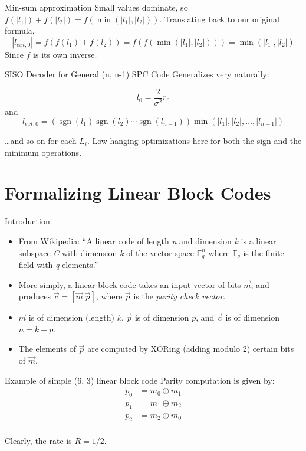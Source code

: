 \documentclass[aspectratio=1610, 10pt]{beamer}
\DeclareMathOperator{\sgn}{sgn}
\begin{document}
\begin{frame}[label={sec:org9aeebc2}]{Min-sum approximation}
Small values dominate, so \(f(|l_1|) + f(|l_2|) =
f(\min{(|l_1|, |l_2|)})\). Translating back to our original formula,
$$|l_{ext,0}| = f(f(l_1) + f(l_2)) = f(f(\min{(|l_1|, |l_2|)})) =
\min{(|l_1|, |l_2|)}$$
Since \(f\) is its own inverse.
\end{frame}

\begin{frame}[label={sec:org236c83d}]{SISO Decoder for General (n, n-1) SPC Code}
Generalizes very naturally:

$$l_0 = \frac{2}{\sigma^2}r_0$$
and
$$l_{ext,0} = (\sgn{(l_1)}\sgn{(l_2)}\cdots\sgn{(l_{n-1})})\min{(|l_1|, |l_2|,
\ldots, |l_{n-1}|)}$$

\ldots{}and so on for each \(L_i\). Low-hanging optimizations here for both
the sign and the minimum operations.
\end{frame}

\section{Formalizing Linear Block Codes}
\label{sec:org2e2c8ff}

\begin{frame}[label={sec:org2f0f6fa}]{Introduction}
\begin{itemize}
\item From Wikipedia: ``A \alert{linear code} of length \emph{n} and dimension
\emph{k} is a linear subspace \emph{C} with dimension \emph{k} of the vector space
\(\mathbb{F}_q^n\) where \(\mathbb{F}_q\) is the
finite field with \emph{q} elements.''
\item More simply, a linear block code takes an input vector of bits
\(\vec{m}\), and produces \(\vec{c} = [\vec{m}~\vec{p}]\), where
\(\vec{p}\) is the \emph{parity check vector}.
\item \(\vec{m}\) is of dimension (length) \(k\), \(\vec{p}\) is of dimension
\(p\), and \(\vec{c}\) is of dimension \(n=k+p\).
\item The elements of \(\vec{p}\) are computed by XORing (adding modulo 2)
certain bits of \(\vec{m}\).
\end{itemize}
\end{frame}

\begin{frame}[label={sec:orgd4e60b8}]{Example of simple (6, 3) linear block code}
Parity computation is given by:
\begin{align*}
p_0 &= m_0 \oplus m_1\\
p_1 &= m_1 \oplus m_2\\
p_2 &= m_2 \oplus m_0\\
\end{align*}

Clearly, the rate is \(R=1/2\).
\end{frame}
\end{document}
